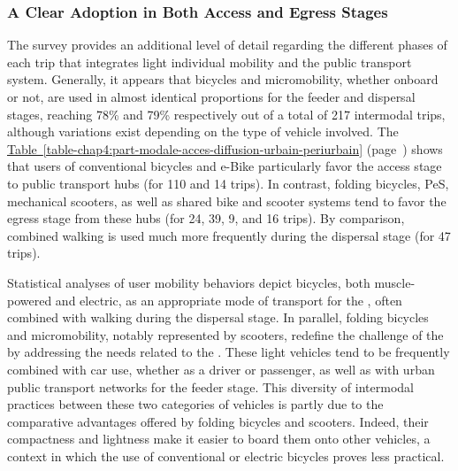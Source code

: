 \begin{refsegment}
\subsubsection*{A Clear Adoption in Both Access and Egress Stages
    \label{chap4:rabattement-diffusion}
    }

The survey provides an additional level of detail regarding the different phases of each trip that integrates light individual mobility and the public transport system. Generally, it appears that bicycles and micromobility, whether onboard or not, are used in almost identical proportions for the feeder and dispersal stages, reaching 78\% and 79\% respectively out of a total of 217 intermodal trips, although variations exist depending on the type of vehicle involved. The \hyperref[table-chap4:part-modale-acces-diffusion-urbain-periurbain]{Table~\ref{table-chap4:part-modale-acces-diffusion-urbain-periurbain}} (page~\pageref{table-chap4:part-modale-acces-diffusion-urbain-periurbain}) shows that users of conventional bicycles and \acrshort{e-Bike} particularly favor the access stage to public transport hubs (for 110 and 14 trips). In contrast, folding bicycles, \acrshort{PeS}, mechanical scooters, as well as shared bike and scooter systems tend to favor the egress stage from these hubs (for 24, 39, 9, and 16 trips). By comparison, combined walking is used much more frequently during the dispersal stage (for 47 trips).%

Statistical analyses of user mobility behaviors depict bicycles, both muscle-powered and electric, as an appropriate mode of transport for the , often combined with walking during the dispersal stage. In parallel, folding bicycles and micromobility, notably represented by scooters, redefine the challenge of the  by addressing the needs related to the . These light vehicles tend to be frequently combined with car use, whether as a driver or passenger, as well as with urban public transport networks for the feeder stage. This diversity of intermodal practices between these two categories of vehicles is partly due to the comparative advantages offered by folding bicycles and scooters. Indeed, their compactness and lightness make it easier to board them onto other vehicles, a context in which the use of conventional or electric bicycles proves less practical.%


\end{refsegment}
